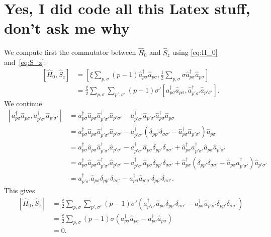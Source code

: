 \documentclass[a4paper,11pt,twoside]{article}
\begin{document}
\section{Yes, I did code all this Latex stuff, don't ask me why}
We compute first the commutator between $\hat H_0$ and $\hat S_z$ using \eqref{eq:H_0} and~\eqref{eq:S_z}:
\begin{align*}
\left[ \hat H_0 , \hat S_z \right]
%
&= \left[ \xi \sum_{p,\sigma} (p-1) \hat a_{p\sigma}^\dagger \hat a_{p\sigma} , \frac{1}{2} \sum_{p,\sigma} \sigma \hat a_{p\sigma}^\dagger \hat a_{p\sigma} \right] \\
%
&= \frac{\xi}{2} \sum_{p,\sigma} \sum_{p',\sigma'} (p-1) \sigma' \left[ a_{p\sigma}^\dagger \hat a_{p\sigma}, \hat a_{p'\sigma'}^\dagger \hat a_{p'\sigma'} \right].
\end{align*}
%
We continue
\begin{align*}
\left[ a_{p\sigma}^\dagger \hat a_{p\sigma}, a_{p'\sigma'}^\dagger \hat a_{p'\sigma'} \right]
%
&= a_{p\sigma}^\dagger \hat a_{p\sigma} \hat a_{p'\sigma'}^\dagger \hat a_{p'\sigma'} -
a_{p'\sigma'}^\dagger \hat a_{p'\sigma'} \hat a_{p\sigma}^\dagger \hat a_{p\sigma} \\
%
&= a_{p\sigma}^\dagger \hat a_{p\sigma} \hat a_{p'\sigma'}^\dagger \hat a_{p'\sigma'} -
a_{p'\sigma'}^\dagger \left( \delta_{pp'} \delta_{\sigma \sigma'} - \hat a_{p\sigma}^\dagger  \hat a_{p'\sigma'} \right) \hat a_{p\sigma} \\
%
&= a_{p\sigma}^\dagger \hat a_{p\sigma} \hat a_{p'\sigma'}^\dagger \hat a_{p'\sigma'} -
a_{p'\sigma'}^\dagger \hat a_{p\sigma} \delta_{pp'} \delta_{\sigma \sigma'} +
\hat a_{p\sigma}^\dagger a_{p'\sigma'}^\dagger \hat a_{p\sigma} \hat a_{p'\sigma'} \\
%
&= a_{p\sigma}^\dagger \hat a_{p\sigma} \hat a_{p'\sigma'}^\dagger \hat a_{p'\sigma'} -
a_{p'\sigma'}^\dagger \hat a_{p\sigma} \delta_{pp'} \delta_{\sigma \sigma'} +
\hat a_{p\sigma}^\dagger \left( \delta_{pp'} \delta_{\sigma\sigma'} - \hat a_{p\sigma} a_{p'\sigma'}^\dagger \right) \hat a_{p'\sigma'} \\
%
&= a_{p'\sigma'}^\dagger \hat a_{p\sigma} \delta_{pp'} \delta_{\sigma \sigma'} -
a_{p\sigma}^\dagger \hat a_{p'\sigma'} \delta_{pp'} \delta_{\sigma \sigma'} .
\end{align*}
%
This gives
\begin{align*}
\left[ \hat H_0 , \hat S_z \right]
%
&= \frac{\xi}{2} \sum_{p,\sigma} \sum_{p',\sigma'} (p-1) \sigma' \left(
a_{p'\sigma'}^\dagger \hat a_{p\sigma} \delta_{pp'} \delta_{\sigma \sigma'} -
a_{p\sigma}^\dagger \hat a_{p'\sigma'} \delta_{pp'} \delta_{\sigma \sigma'} \right) \\
%
&= \frac{\xi}{2} \sum_{p,\sigma} (p-1) \sigma \left(
a_{p\sigma}^\dagger \hat a_{p\sigma} -
a_{p\sigma}^\dagger \hat a_{p\sigma} \right) \\
%
&= 0 .
\end{align*}
\end{document}

